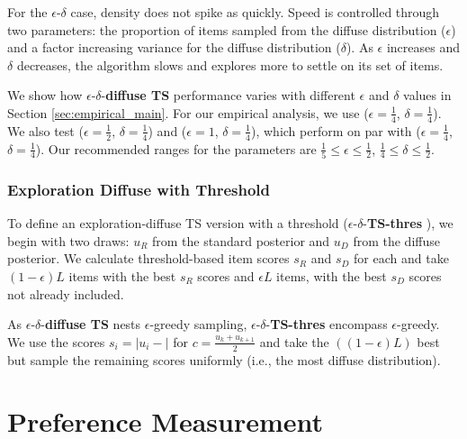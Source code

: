 \documentclass[nonblindrev]{informs3}
\newcommand{\alexander}[1]{\textcolor{blue}{\textbf{(alexander)} #1}}
\newcommand{\eric}[1]{\textcolor{red}{\textbf{(eric)} #1}}
\newcommand{\edts}{$\epsilon$-$\delta$-\textbf{diffuse TS} }
\newcommand{\edtsthres}{$\epsilon$-$\delta$-\textbf{TS-thres} }
\newcommand{\numperset}{L}
\begin{document}
For the $\epsilon$-$\delta$ case, density does not spike as quickly. Speed is controlled through two parameters: the proportion of items sampled from the diffuse distribution ($\epsilon$) and a factor increasing variance for the diffuse distribution ($\delta$). As $\epsilon$ increases and $\delta$ decreases, the algorithm slows and explores more to settle on its set of items. 

We show how \edts performance varies with different $\epsilon$ and $\delta$ values in Section \ref{sec:empirical_main}.  For our empirical analysis, we use ($\epsilon=\frac{1}{4}$, $\delta=\frac{1}{4}$). We also test ($\epsilon=\frac{1}{2}$, $\delta=\frac{1}{4}$) and ($\epsilon=1$, $\delta=\frac{1}{4}$), which perform on par with ($\epsilon=\frac{1}{4}$, $\delta=\frac{1}{4}$). Our recommended ranges for the parameters are $\frac{1}{5}\leq \epsilon \leq \frac{1}{2}$, $\frac{1}{4}\leq \delta \leq \frac{1}{2}$.



\subsubsection{Exploration Diffuse with Threshold}

To define an exploration-diffuse TS version with a threshold (\edtsthres), we begin with two draws: $u_R$ from the standard posterior and $u_D$ from the diffuse posterior. We calculate threshold-based item scores $s_R$ and $s_D$ for each and take $(1- \epsilon) \numperset$ items with the best $s_R$ scores and $\epsilon \numperset$ items, with the best $s_D$ scores not already included. 

As \edts nests $\epsilon$-greedy sampling, \edtsthres encompass $\epsilon$-greedy. We use the scores $s_i=|u_i - |$ for $c=\frac{u_k+u_{k+1}}{2}$ and take the $((1-\epsilon)L)$ best but sample the remaining scores uniformly (i.e., the most diffuse distribution).

\section{Preference Measurement}
\end{document}
